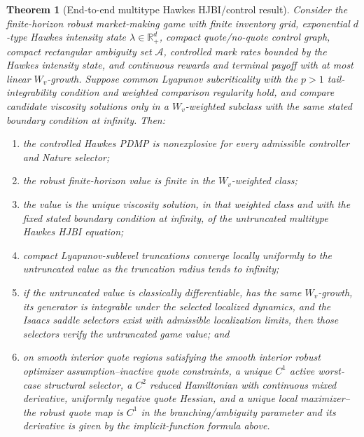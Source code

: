 \documentclass[11pt]{article}
\newtheorem{theorem}{Theorem}
\newcommand{\R}{\mathbb{R}}
\begin{document}
\begin{theorem}[End-to-end multitype Hawkes HJBI/control result]
Consider the finite-horizon robust market-making game with finite inventory
grid, exponential $d$-type Hawkes intensity state $\lambda\in\R_+^d$, compact
quote/no-quote control graph, compact rectangular ambiguity set $\mathcal A$,
controlled mark rates bounded by the Hawkes intensity state, and continuous
rewards and terminal payoff with at most linear $W_v$-growth. Suppose common
Lyapunov subcriticality with the $p>1$ tail-integrability condition and
weighted comparison regularity hold, and compare candidate viscosity solutions
only in a $W_v$-weighted subclass with the same stated boundary condition at
infinity. Then:
\begin{enumerate}
\item the controlled Hawkes PDMP is nonexplosive for every admissible
controller and Nature selector;
\item the robust finite-horizon value is finite in the $W_v$-weighted class;
\item the value is the unique viscosity solution, in that weighted class and
with the fixed stated boundary condition at infinity, of the untruncated
multitype Hawkes HJBI equation;
\item compact Lyapunov-sublevel truncations converge locally uniformly to the
untruncated value as the truncation radius tends to infinity;
\item if the untruncated value is classically differentiable, has the same
$W_v$-growth, its generator is integrable under the selected localized
dynamics, and the Isaacs saddle selectors exist with admissible localization
limits, then those selectors verify the untruncated game value; and
\item on smooth interior quote regions satisfying the smooth interior robust
optimizer assumption--inactive quote constraints, a unique $C^1$ active
worst-case structural selector, a $C^2$ reduced Hamiltonian with continuous
mixed derivative, uniformly negative quote Hessian, and a unique local
maximizer--the robust quote map is $C^1$ in the branching/ambiguity parameter
and its derivative is given by the implicit-function formula above.
\end{enumerate}
\end{theorem}
\end{document}
